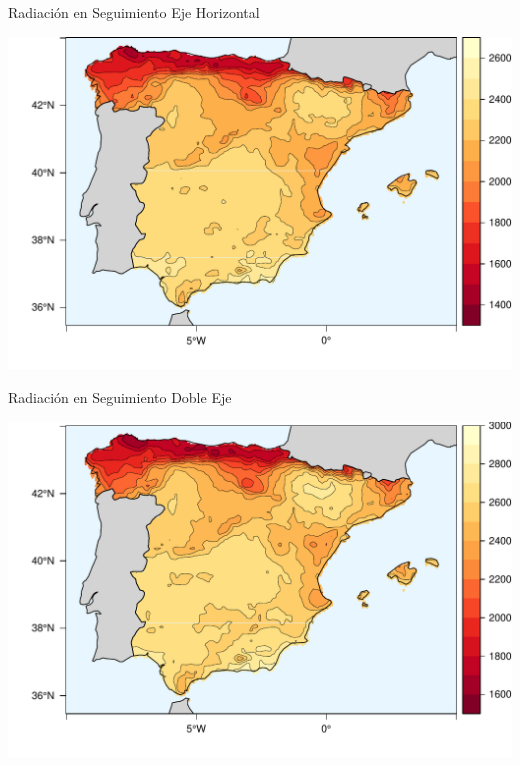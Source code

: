 \documentclass[xcolor={usenames,svgnames,dvipsnames}]{beamer}
\begin{document}
\begin{frame}[label={sec:orgec6f568}]{Radiación en Seguimiento Eje Horizontal}
\begin{center}
\includegraphics[width=.9\linewidth]{../figs/HorizKrig.pdf}
\end{center}
\end{frame}



\begin{frame}[label={sec:orgbd660ba}]{Radiación en Seguimiento Doble Eje}
\begin{center}
\includegraphics[width=.9\linewidth]{../figs/TwoKrig.pdf}
\end{center}
\end{frame}
\end{document}
